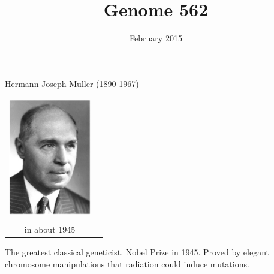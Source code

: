 \documentclass[bluish,slideColor,colorBG,pdf]{prosper}
\author{February 2015}
\title{Genome 562}
\begin{document}
\maketitle

\begin{slide}[Replace]{Hermann Joseph Muller (1890-1967) }

\begin{center}
\begin{tabular}{c c}
\includegraphics[height=2in]{Muller1945ish.ps}\\
& \\
in about 1945 \\
\end{tabular}
\end{center}
\bigskip

The greatest classical geneticist. Nobel Prize in 1945. Proved by elegant
chromosome manipulations that radiation could induce mutations.

\end{slide}
\end{document}

